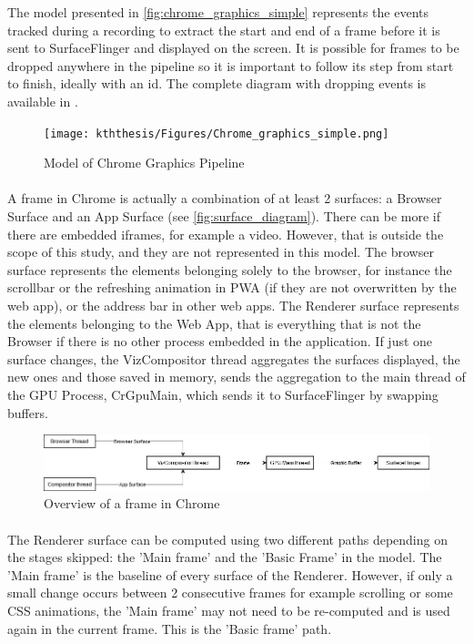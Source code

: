 The model presented in \autoref{fig:chrome_graphics_simple} represents the events tracked during a recording to extract the start and end of a frame before it is sent to SurfaceFlinger and displayed on the screen. It is possible for frames to be dropped anywhere in the pipeline so it is important to follow its step from start to finish, ideally with an id. The complete diagram with dropping events is available in .

\begin{figure}[!ht]
    \centering
    \texttt{[image: kththesis/Figures/Chrome\_graphics\_simple.png]}
    \caption{Model of Chrome Graphics Pipeline}
    \label{fig:chrome_graphics_simple}
\end{figure}
        
        
   
        
 \paragraph{}
A frame in Chrome is actually a combination of at least 2 surfaces: a Browser Surface and an App Surface (see \autoref{fig:surface_diagram}). There can be more if there are embedded iframes, for example a video. However, that is outside the scope of this study, and they are not represented in this model. The browser surface represents the elements belonging solely to the browser, for instance the scrollbar or the refreshing animation in PWA (if they are not overwritten by the web app), or the address bar in other web apps. The Renderer surface represents the elements belonging to the Web App, that is everything that is not the Browser if there is no other process embedded in the application. If just one surface changes, the VizCompositor thread aggregates the surfaces displayed, the new ones and those saved in memory, sends the aggregation to the main thread of the GPU Process, CrGpuMain, which sends it to SurfaceFlinger by swapping buffers. 

\begin{figure}
    \centering
    \includegraphics[width=13cm]{kththesis/Figures/surface_diagram.png}
    \caption{Overview of a frame in Chrome}
    \label{fig:surface_diagram}
\end{figure}
\paragraph{}
The Renderer surface can be computed using two different paths depending on the stages skipped: the 'Main frame' and the 'Basic Frame' in the model. The 'Main frame' is the baseline of every surface of the Renderer. However, if only a small change occurs between 2 consecutive frames for example scrolling or some CSS animations, the 'Main frame' may not need to be re-computed and is used again in the current frame. This is the 'Basic frame' path. \newline

